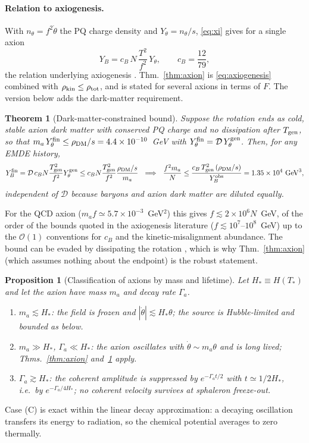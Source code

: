 \documentclass[11pt]{article}
\newtheorem{proposition}{Proposition}
\newtheorem{theorem}{Theorem}
\newcommand{\Yobs}{Y_B^{\rm obs}}
\begin{document}
\paragraph{Relation to axiogenesis.} With $n_\theta=f^2\dot\theta$ the PQ charge density and $Y_\theta=n_\theta/s$, \eqref{eq:xi} gives for a single axion
\begin{equation}
Y_B=c_B\,N\,\frac{T^2}{f^2}\,Y_\theta,\qquad c_B=\frac{12}{79},\label{eq:axiogenesis}
\end{equation}
the relation underlying axiogenesis \cite{Co:2019}. Thm.~\ref{thm:axion} is \eqref{eq:axiogenesis} combined with $\rho_{\rm kin}\le\rho_{\rm tot}$, and is stated for several axions in terms of $F$. The version below adds the dark-matter requirement.
\begin{theorem}[Dark-matter-constrained bound]\label{thm:dm}
Suppose the rotation ends as cold, stable axion dark matter with conserved PQ charge and no dissipation after $T_{\rm gen}$, so that $m_a\,Y_\theta^{\rm fin}\le\rho_{\rm DM}/s=4.4\times10^{-10}$~GeV with $Y_\theta^{\rm fin}=\mathcal D\,Y_\theta^{\rm gen}$. Then, for any EMDE history,
\begin{equation}
Y_B^{\rm fin}=\mathcal D\,c_BN\frac{T_{\rm gen}^2}{f^2}Y_\theta^{\rm gen}\le c_BN\frac{T_{\rm gen}^2}{f^2}\frac{\rho_{\rm DM}/s}{m_a}\ \ \Longrightarrow\ \ \frac{f^2m_a}{N}\le\frac{c_B\,T_{\rm gen}^2\,(\rho_{\rm DM}/s)}{\Yobs}=\DMbound~\text{GeV}^3,
\end{equation}
independent of $\mathcal D$ because baryons and axion dark matter are diluted equally.
\end{theorem}
\noindent For the QCD axion ($m_af\simeq5.7\times10^{-3}$~GeV$^2$) this gives $f\lesssim2\times10^{6}N$~GeV, of the order of the bounds quoted in the axiogenesis literature ($f\lesssim10^{7}$--$10^{8}$~GeV) up to the $\mathcal O(1)$ conventions for $c_B$ and the kinetic-misalignment abundance. The bound can be evaded by dissipating the rotation \cite{Asadi:2025}, which is why Thm.~\ref{thm:axion} (which assumes nothing about the endpoint) is the robust statement.
\begin{proposition}[Classification of axions by mass and lifetime]\label{prop:class}
Let $H_*\equiv H(T_*)$ and let the axion have mass $m_a$ and decay rate $\Gamma_a$.
\begin{enumerate}
\item[(A)] $m_a\lesssim H_*$: the field is frozen and $|\dot\theta|\lesssim H_*\theta$; the source is Hubble-limited and bounded as below.
\item[(B)] $m_a\gg H_*$, $\Gamma_a\ll H_*$: the axion oscillates with $\dot\theta\sim m_a\theta$ and is long lived; Thms.~\ref{thm:axion} and~\ref{thm:dm} apply.
\item[(C)] $\Gamma_a\gtrsim H_*$: the coherent amplitude is suppressed by $e^{-\Gamma_a t/2}$ with $t\simeq1/2H_*$, i.e.\ by $e^{-\Gamma_a/4H_*}$; no coherent velocity survives at sphaleron freeze-out.
\end{enumerate}
\end{proposition}
\noindent Case (C) is exact within the linear decay approximation: a decaying oscillation transfers its energy to radiation, so the chemical potential averages to zero thermally.
\end{document}
